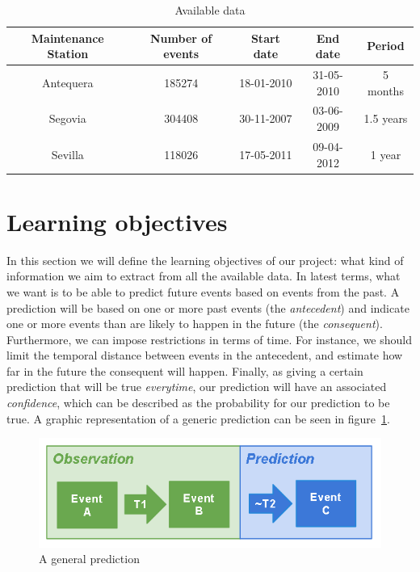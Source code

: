 \documentclass[a4paper,12pt]{article}
\begin{document}
\begin{table}
\begin{center}
\begin{tabular}{|c|c|c|c|c|}
\hline Maintenance Station & Number of events & Start date & End date & Period \\ 
\hline Antequera & 185274 & 18-01-2010 & 31-05-2010 &  5 months \\ 
\hline Segovia & 304408 & 30-11-2007 & 03-06-2009 &  1.5 years \\ 
\hline Sevilla & 118026 & 17-05-2011 & 09-04-2012 &  1 year \\ 
\hline 
\end{tabular}
\end{center} 
\caption {Available data} \label{tab:data_details} 
\end{table}

\section{Learning objectives}
In this section we will define the learning objectives of our project: what kind of information we aim to extract from all the available data. In latest terms, what we want is to be able to predict future events based on events from the past. A prediction will be based on one or more past events (the \emph{antecedent}) and indicate one or more events than are likely to happen in the future (the \emph{consequent}). Furthermore, we can impose restrictions in terms of time. For instance, we should limit the temporal distance between events in the antecedent, and estimate how far in the future the consequent will happen. Finally, as giving a certain prediction that will be true \emph{everytime}, our prediction will have an associated \emph{confidence}, which can be described as the probability for our prediction to be true. A graphic representation of a generic prediction can be seen in figure~\ref{fig:ass_rule}.

\begin{figure}[hbtp]
\includegraphics[width=\textwidth]{./img/association_rules.png}
\caption{A general prediction} \label{fig:ass_rule}
\end{figure}
\end{document}
